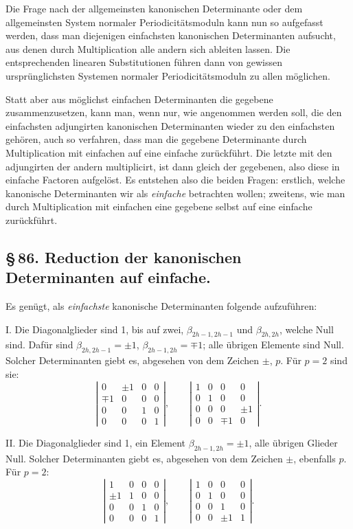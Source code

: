 \documentclass[10pt]{article}
\begin{document}
Die Frage nach der allgemeinsten kanonischen Determinante oder dem allgemeinsten System normaler Periodicitätsmoduln kann nun so aufgefasst werden, dass man diejenigen einfachsten kanonischen Determinanten aufsucht, aus denen durch Multiplication alle andern sich ableiten lassen. Die entsprechenden linearen Substitutionen führen dann von gewissen ursprünglichsten Systemen normaler Periodicitätsmoduln zu allen möglichen.

Statt aber aus möglichst einfachen Determinanten die gegebene zusammenzusetzen, kann man, wenn nur, wie angenommen werden soll, die den einfachsten adjungirten kanonischen Determinanten wieder zu den einfachsten gehören, auch so verfahren, dass man die gegebene Determinante durch Multiplication mit einfachen auf eine einfache zurückführt. Die letzte mit den adjungirten der andern multiplicirt, ist dann gleich der gegebenen, also diese in einfache Factoren aufgelöst. Es entstehen also die beiden Fragen: erstlich, welche kanonische Determinanten wir als \emph{einfache} betrachten wollen; zweitens, wie man durch Multiplication mit einfachen eine gegebene selbst auf eine einfache zurückführt.

\subsection*{\S\,86. Reduction der kanonischen Determinanten auf einfache.}

Es genügt, als \emph{einfachste} kanonische Determinanten folgende aufzuführen:

I. Die Diagonalglieder sind 1, bis auf zwei, \(\beta_{2h-1,2h-1}\) und \(\beta_{2h,2h}\), welche Null sind. Dafür sind \(\beta_{2h,2h-1}=\pm1\), \(\beta_{2h-1,2h}=\mp1\); alle übrigen Elemente sind Null. Solcher Determinanten giebt es, abgesehen von dem Zeichen \(\pm\), \(p\). Für \(p=2\) sind sie:
\[
\left|\begin{array}{rrrr}0&\pm1&0&0\\ \mp1&0&0&0\\ 0&0&1&0\\ 0&0&0&1\end{array}\right|,
\qquad
\left|\begin{array}{rrrr}1&0&0&0\\ 0&1&0&0\\ 0&0&0&\pm1\\ 0&0&\mp1&0\end{array}\right|.
\]

II. Die Diagonalglieder sind 1, ein Element \(\beta_{2h-1,2h}=\pm1\), alle übrigen Glieder Null. Solcher Determinanten giebt es, abgesehen von dem Zeichen \(\pm\), ebenfalls \(p\). Für \(p=2\):
\[
\left|\begin{array}{rrrr}1&0&0&0\\ \pm1&1&0&0\\ 0&0&1&0\\ 0&0&0&1\end{array}\right|,
\qquad
\left|\begin{array}{rrrr}1&0&0&0\\ 0&1&0&0\\ 0&0&1&0\\ 0&0&\pm1&1\end{array}\right|.
\]
\end{document}
